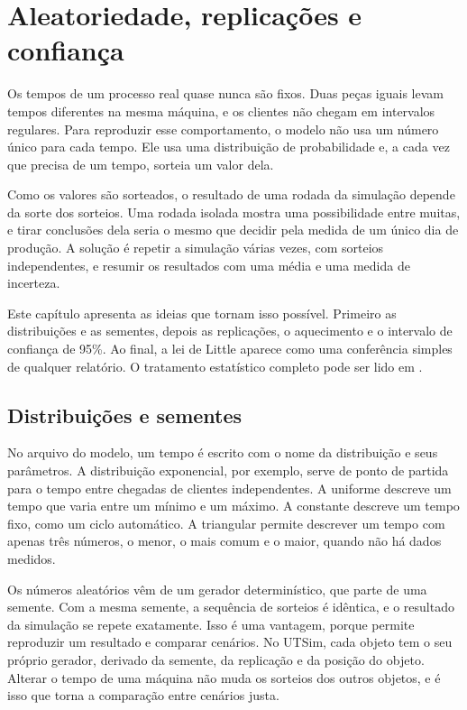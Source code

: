 \chapter{Aleatoriedade, replicações e confiança}
\label{cap-aleatoriedade}


Os tempos de um processo real quase nunca são fixos. Duas peças iguais levam tempos diferentes na mesma máquina, e os clientes não chegam em intervalos regulares. Para reproduzir esse comportamento, o modelo não usa um número único para cada tempo. Ele usa uma distribuição de probabilidade e, a cada vez que precisa de um tempo, sorteia um valor dela.

Como os valores são sorteados, o resultado de uma rodada da simulação depende da sorte dos sorteios. Uma rodada isolada mostra uma possibilidade entre muitas, e tirar conclusões dela seria o mesmo que decidir pela medida de um único dia de produção. A solução é repetir a simulação várias vezes, com sorteios independentes, e resumir os resultados com uma média e uma medida de incerteza.

Este capítulo apresenta as ideias que tornam isso possível. Primeiro as distribuições e as sementes, depois as replicações, o aquecimento e o intervalo de confiança de 95\%. Ao final, a lei de Little aparece como uma conferência simples de qualquer relatório. O tratamento estatístico completo pode ser lido em \textcite{law2015}.

\section{Distribuições e sementes}

No arquivo do modelo, um tempo é escrito com o nome da distribuição e seus parâmetros. A distribuição exponencial, por exemplo, serve de ponto de partida para o tempo entre chegadas de clientes independentes. A uniforme descreve um tempo que varia entre um mínimo e um máximo. A constante descreve um tempo fixo, como um ciclo automático. A triangular permite descrever um tempo com apenas três números, o menor, o mais comum e o maior, quando não há dados medidos.

Os números aleatórios vêm de um gerador determinístico, que parte de uma semente. Com a mesma semente, a sequência de sorteios é idêntica, e o resultado da simulação se repete exatamente. Isso é uma vantagem, porque permite reproduzir um resultado e comparar cenários. No UTSim, cada objeto tem o seu próprio gerador, derivado da semente, da replicação e da posição do objeto. Alterar o tempo de uma máquina não muda os sorteios dos outros objetos, e é isso que torna a comparação entre cenários justa.

